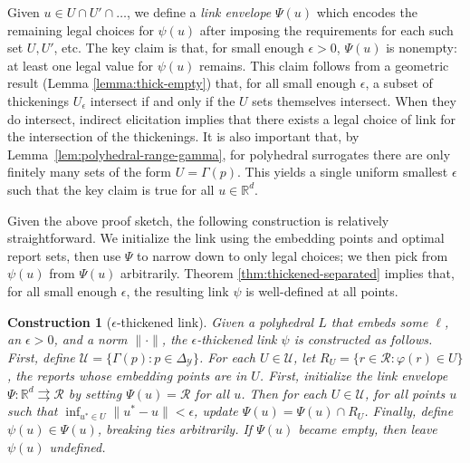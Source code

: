 \documentclass[11pt]{article}
\newcommand{\reals}{\mathbb{R}}
\newcommand{\simplex}{\Delta_\Y}
\newcommand{\R}{\mathcal{R}}
\newcommand{\U}{\mathcal{U}}
\newcommand{\Y}{\mathcal{Y}}
\newcommand{\toto}{\rightrightarrows}
\newtheorem{construction}{Construction}
\begin{document}
Given $u \in U \cap U' \cap \dots$, we define a \emph{link envelope} $\Psi(u)$ which encodes the remaining legal choices for $\psi(u)$ after imposing the requirements for each such set $U,U'$, etc.
The key claim is that, for small enough $\epsilon > 0$, $\Psi(u)$ is nonempty: at least one legal value for $\psi(u)$ remains.
This claim follows from a geometric result (Lemma \ref{lemma:thick-empty}) that, for all small enough $\epsilon$, a subset of thickenings $U_{\epsilon}$ intersect if and only if the $U$ sets themselves intersect.
When they do intersect, indirect elicitation implies that there exists a legal choice of link for the intersection of the thickenings.
It is also important that, by Lemma~\ref{lem:polyhedral-range-gamma}, for polyhedral surrogates there are only finitely many sets of the form $U = \Gamma(p)$.
This yields a single uniform smallest $\epsilon$ such that the key claim is true for all $u \in \reals^d$.

Given the above proof sketch, the following construction is relatively straightforward.
We initialize the link using the embedding points and optimal report sets, then use $\Psi$ to narrow down to only legal choices; we then pick from $\psi(u)$ from $\Psi(u)$ arbitrarily.
Theorem \ref{thm:thickened-separated} implies that, for all small enough $\epsilon$, the resulting link $\psi$ is well-defined at all points.
\begin{construction}[$\epsilon$-thickened link] \label{const:eps-thick-link}
  Given a polyhedral $L$ that embeds some $\ell$, an $\epsilon > 0$, and a norm $\|\cdot\|$, the \emph{$\epsilon$-thickened link} $\psi$ is constructed as follows.
  First, define $\U = \{\Gamma(p) : p \in \simplex\}$.
  For each $U \in \U$, let $R_U = \{r \in \R : \varphi(r) \in U\}$, the reports whose embedding points are in $U$.
  First, initialize the \emph{link envelope} $\Psi: \reals^d \toto \R$ by setting $\Psi(u) = \R$ for all $u$.
  Then for each $U \in \U$, for all points $u$ such that $\inf_{u^* \in U} \|u^*-u\| < \epsilon$, update $\Psi(u) = \Psi(u) \cap R_U$.
  Finally, define $\psi(u) \in \Psi(u)$, breaking ties arbitrarily.
  If $\Psi(u)$ became empty, then leave $\psi(u)$ undefined.
\end{construction}
\end{document}

